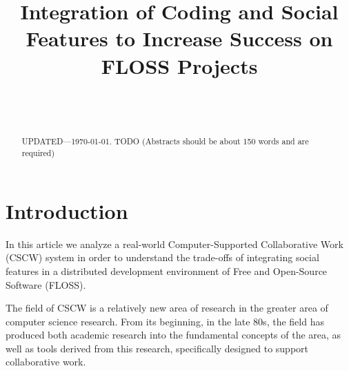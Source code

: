 \documentclass{sigchi}
\begin{document}
\title{Integration of Coding and Social Features to Increase Success on FLOSS Projects}

\author{%
  \\
  \\
}

\maketitle

\begin{abstract}
  UPDATED---\today. TODO (Abstracts should be about 150 words and are required)
\end{abstract}

 


\section{Introduction}

In this article we analyze a real-world Computer-Supported Collaborative Work (CSCW) system in order to understand the trade-offs of integrating social features in a distributed development environment of Free and Open-Source Software (FLOSS).

The field of CSCW is a relatively new area of research in the greater area of computer science research. From its beginning, in the late 80s, the field has produced both academic research into the fundamental concepts of the area, as well as tools derived from this research, specifically designed to support collaborative work.
\end{document}
